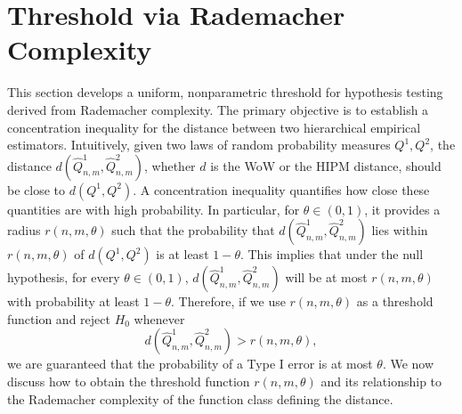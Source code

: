 \section{Threshold via Rademacher Complexity}\label{section:rademacher_complexity}


This section develops a uniform, nonparametric threshold for hypothesis testing derived from Rademacher complexity. The primary objective is to establish a concentration inequality for the distance between two hierarchical empirical estimators. Intuitively, given two laws of random probability measures $Q^1, Q^2$, the distance $d(\widehat{Q}^1_{n,m}, \widehat{Q}^2_{n,m})$, whether $d$ is the WoW or the HIPM distance, should be close to $d(Q^1, Q^2)$. A concentration inequality quantifies how close these quantities are with high probability. In particular, for $\theta \in (0,1)$, it provides a radius $r(n, m, \theta)$ such that the probability that $d(\widehat{Q}^1_{n,m}, \widehat{Q}^2_{n,m})$ lies within $r(n, m, \theta)$ of $d(Q^1, Q^2)$ is at least $1 - \theta$. This implies that under the null hypothesis, for every $\theta \in (0, 1)$, $d(\widehat{Q}^1_{n,m}, \widehat{Q}^2_{n,m})$ will be at most $r(n, m, \theta)$ with probability at least $1 - \theta$. Therefore, if we use $r(n, m, \theta)$ as a threshold function and reject $H_0$ whenever
\[
d(\widehat{Q}^1_{n,m}, \widehat{Q}^2_{n,m}) > r(n, m, \theta),
\]
we are guaranteed that the probability of a Type I error is at most $\theta$. We now discuss how to obtain the threshold function $r(n, m, \theta)$ and its relationship to the Rademacher complexity of the function class defining the distance.

